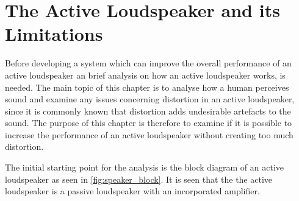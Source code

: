 


\chapter{The Active Loudspeaker and its Limitations}
Before developing a system which can improve the overall performance of an active loudspeaker an brief analysis on how an active loudspeaker works, is needed. The main topic of this chapter is to analyse how a human perceives sound and examine any issues concerning distortion in an active loudspeaker, since it is commonly known that distortion adds undesirable artefacts to the sound. The purpose of this chapter is therefore to examine if it is possible to increase the performance of an active loudspeaker without creating too much distortion. 

The initial starting point for the analysis is the block diagram of an active loudspeaker as seen in \autoref{fig:speaker_block}. It is seen that the the active loudspeaker is a passive loudspeaker with an incorporated amplifier.

